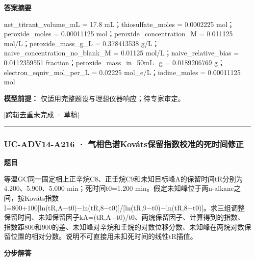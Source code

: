 \documentclass[UTF8,11pt,a4paper]{ctexart}
\begin{document}
\noindent\textbf{答案摘要}\par
net\_titrant\_volume\_mL = 17.8 mL；thiosulfate\_moles = 0.0002225 mol；peroxide\_moles = 0.00011125 mol；peroxide\_concentration\_M = 0.011125 mol/L；peroxide\_mass\_g\_L = 0.378413538 g/L；naive\_concentration\_no\_blank\_M = 0.01125 mol/L；naive\_relative\_bias = 0.0112359551 fraction；peroxide\_mass\_in\_50mL\_g = 0.0189206769 g；electron\_equiv\_mol\_per\_L = 0.02225 mol\_e/L；iodine\_moles = 0.00011125 mol\par
\noindent\textbf{模型前提：}
仅适用完整题设与理想仪器响应；待专家审定。\par
\noindent\textcolor{red!65!black}{[跨辑去重未完成 · 草稿]} \par
\medskip\hrule\medskip
{}
\subsubsection*{UC-ADV14-A216 · 气相色谱Kováts保留指数校准的死时间修正}
\noindent\textbf{题目}\par
等温GC同一固定相上正辛烷C8、正壬烷C9和未知目标峰A的保留时间tR分别为4.200、5.900、5.000 min；死时间t0=1.200 min。假定未知峰位于两n-alkane之间，按Kováts指数I=800+100[ln(tR,A−t0)−ln(tR,8−t0)]/[ln(tR,9−t0)−ln(tR,8−t0)]。求三组调整保留时间、未知保留因子kA=(tR,A−t0)/t0、两烷保留因子、计算得到的指数、指数距800和900的差、未知峰对辛烷和壬烷的对数位移分数、未知峰在两烷对数保留位置的相对分数。说明不可直接用未扣死时间的线性tR插值。\par
\medskip\noindent\textbf{分步解答}
\end{document}
